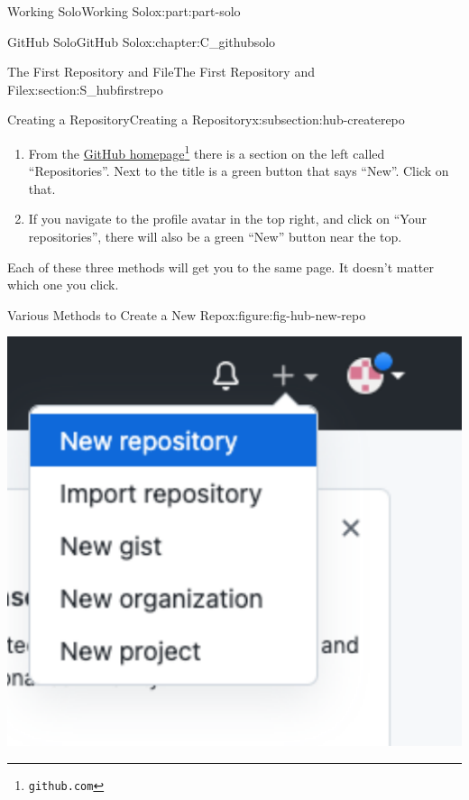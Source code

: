\documentclass[oneside,10pt,]{book}
\begin{document}
\begin{partptx}{Working Solo}{}{Working Solo}{}{}{x:part:part-solo}
\begin{chapterptx}{GitHub Solo}{}{GitHub Solo}{}{}{x:chapter:C_githubsolo}
\begin{sectionptx}{The First Repository and File}{}{The First Repository and File}{}{}{x:section:S_hubfirstrepo}
\begin{subsectionptx}{Creating a Repository}{}{Creating a Repository}{}{}{x:subsection:hub-createrepo}
\begin{enumerate}
\par
Note: GitHub differentiates bewteen a repository and a project. Don't get confused. We want repository (and you will want that for most purposes).%
\item{}From the \href{https://github.com}{GitHub homepage}\footnote{\nolinkurl{github.com}\label{g:fn:idm480289240}} there is a section on the left called ``Repositories''. Next to the title is a green button that says ``New''. Click on that.%
\item{}If you navigate to the profile avatar in the top right, and click on ``Your repositories'', there will also be a green ``New'' button near the top.%
\end{enumerate}
Each of these three methods will get you to the same page. It doesn't matter which one you click.%
\begin{figureptx}{Various Methods to Create a New Repo}{x:figure:fig-hub-new-repo}{}%
\begin{sidebyside}{2}{0.025}{0.025}{0.05}%
\begin{sbspanel}{0.45}%
\includegraphics[width=\linewidth]{external/hub_new_repo_navbar.pdf}
\end{sbspanel}%
\begin{sbspanel}{0.45}%

\end{sbspanel}
\end{sidebyside}
\end{figureptx}
\end{subsectionptx}
\end{sectionptx}
\end{chapterptx}
\end{partptx}
\end{document}
